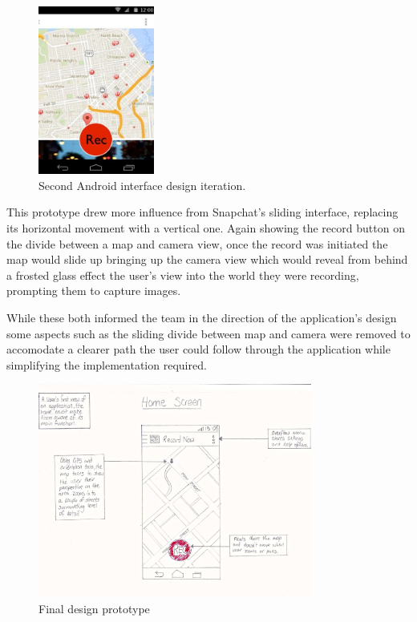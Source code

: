 \documentclass{l3proj}
\begin{document}
\begin{figure}[ht!]
\centering
\includegraphics[width=0.34\textwidth]{images/android-digital-prototype-2.jpg}
\caption{Second Android interface design iteration.}
\end{figure}

This prototype drew more influence from Snapchat’s sliding interface, replacing
its horizontal movement with a vertical one. Again showing the record button on
the divide between a map and camera view, once the record was initiated the map
would slide up bringing up the camera view which would reveal from behind a
frosted glass effect the user's view into the world they were recording,
prompting them to capture images.

While these both informed the team in the direction of the application's design some aspects such as the sliding divide between map and camera were removed to accomodate a clearer path the user could follow through the application while simplifying the implementation required.

\begin{figure}[ht!]
\centering
\includegraphics[width=90mm]{images/android-home-view.jpg}
\caption{Final design prototype}
\end{figure}
\end{document}
